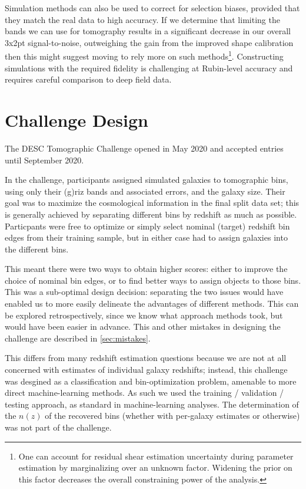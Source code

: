 \documentclass[twocolumn,twocolappendix]{aastex63}
\begin{document}
Simulation methods can also be used to correct for selection biases, provided that they match the
real data to high accuracy.  If we determine that limiting the bands we can use for tomography results
in a significant decrease in our overall 3x2pt signal-to-noise, outweighing the gain from the improved shape
calibration then this might suggest moving to rely more on such methods\footnote{One can account for
residual shear estimation uncertainty during parameter estimation by marginalizing over an unknown
factor.  Widening the prior on this factor decreases the overall constraining power of the analysis.}.
Constructing simulations with the required fidelity is challenging at Rubin-level accuracy and requires
careful comparison to deep field data.


\section{Challenge Design} \label{sec:design}

The DESC Tomographic Challenge opened in May 2020 and accepted entries until September 2020.

In the challenge, participants assigned simulated galaxies to tomographic bins,
using only their (g)riz bands and associated errors, and the galaxy size.  Their goal was to maximize the cosmological
information in the final split data set; this is generally achieved by separating different bins by 
redshift as much as possible.  Particpants were free to optimize or simply select nominal (target) 
redshift bin edges from their training sample, but in either case had to assign galaxies into the 
different bins.

This meant there were two ways to obtain higher scores: either to improve the choice of nominal bin
edges, or to find better ways to assign objects to those bins.  This was a sub-optimal design decision:
separating the two issues would have enabled us to more easily delineate the advantages of different methods. 
This can be explored retrospectively, since we know what approach methods took, but would have been
easier in advance.  This and other mistakes in designing the challenge are described in \autoref{sec:mistakes}.

This differs from many redshift estimation questions because we are not at all concerned with estimates
of individual galaxy redshifts; instead, this challenge was desgined as a classification and bin-optimization
problem, amenable to more direct machine-learning methods.  As such we used the training / validation / testing
approach, as standard in machine-learning analyses.
The determination of the $n(z)$ of the recovered
bins (whether with per-galaxy estimates or otherwise) was not part of the challenge.
\end{document}
